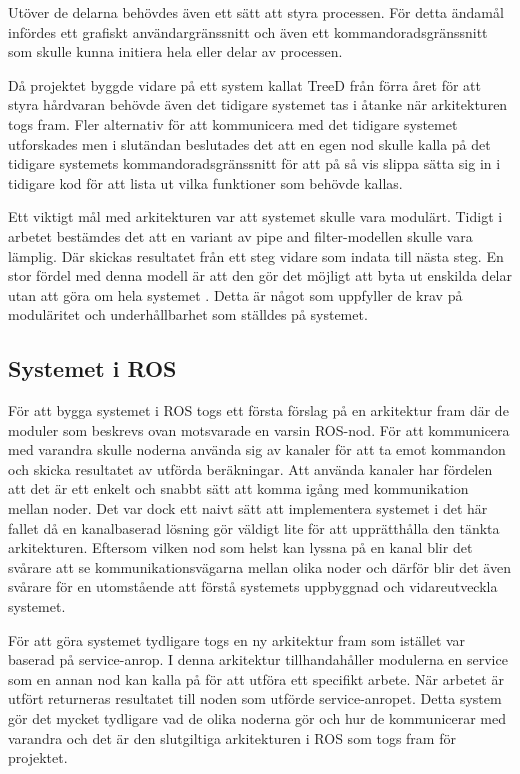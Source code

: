 Utöver de delarna behövdes även ett sätt att styra processen. För detta ändamål infördes ett grafiskt användargränssnitt och även ett kommandoradsgränssnitt som skulle kunna initiera hela eller delar av processen.

Då projektet byggde vidare på ett system kallat TreeD från förra året för att styra hårdvaran behövde även det tidigare systemet tas i åtanke när arkitekturen togs fram. Fler alternativ för att kommunicera med det tidigare systemet utforskades men i slutändan beslutades det att en egen nod skulle kalla på det tidigare systemets kommandoradsgränssnitt för att på så vis slippa sätta sig in i tidigare kod för att lista ut vilka funktioner som behövde kallas.

Ett viktigt mål med arkitekturen var att systemet skulle vara modulärt. Tidigt i arbetet bestämdes det att en variant av pipe and filter-modellen skulle vara lämplig. Där skickas resultatet från ett steg vidare som indata till nästa steg. En stor fördel med denna modell är att den gör det möjligt att byta ut enskilda delar utan att göra om hela systemet \cite{garlan1993introduction}. Detta är något som uppfyller de krav på moduläritet och underhållbarhet som ställdes på systemet.

\subsection{Systemet i ROS}
För att bygga systemet i ROS togs ett första förslag på en arkitektur fram där de moduler som beskrevs ovan motsvarade en varsin ROS-nod. För att kommunicera med varandra skulle noderna använda sig av kanaler för att ta emot kommandon och skicka resultatet av utförda beräkningar. Att använda kanaler har fördelen att det är ett enkelt och snabbt sätt att komma igång med kommunikation mellan noder. Det var dock ett naivt sätt att implementera systemet i det här fallet då en kanalbaserad lösning gör väldigt lite för att upprätthålla den tänkta arkitekturen. Eftersom vilken nod som helst kan lyssna på en kanal blir det svårare att se kommunikationsvägarna mellan olika noder och därför blir det även svårare för en utomstående att förstå systemets uppbyggnad och vidareutveckla systemet.

För att göra systemet tydligare togs en ny arkitektur fram som istället var baserad på service-anrop. I denna arkitektur tillhandahåller modulerna en service som en annan nod kan kalla på för att utföra ett specifikt arbete. När arbetet är utfört returneras resultatet till noden som utförde service-anropet. Detta system gör det mycket tydligare vad de olika noderna gör och hur de kommunicerar med varandra och det är den slutgiltiga arkitekturen i ROS som togs fram för projektet.

